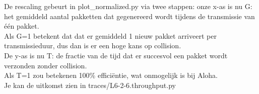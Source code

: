 De rescaling gebeurt in plot\_normalized.py via twee stappen:
onze x-as is nu G: het gemiddeld aantal pakketten dat gegenereerd wordt tijdens de transmissie van één pakket.\\
Als G=1 betekent dat dat er gemiddeld 1 nieuw pakket arriveert per transmissieduur, dus dan is er een hoge kans op collision.  \\

De y-as is nu T: de fractie van de tijd dat er succesvol een pakket wordt verzonden zonder collision.\\ 
Als T=1 zou betekenen 100\% efficiëntie, wat onmogelijk is bij Aloha.\\

Je kan de uitkomst zien in traces/L6-2-6.throughput.py